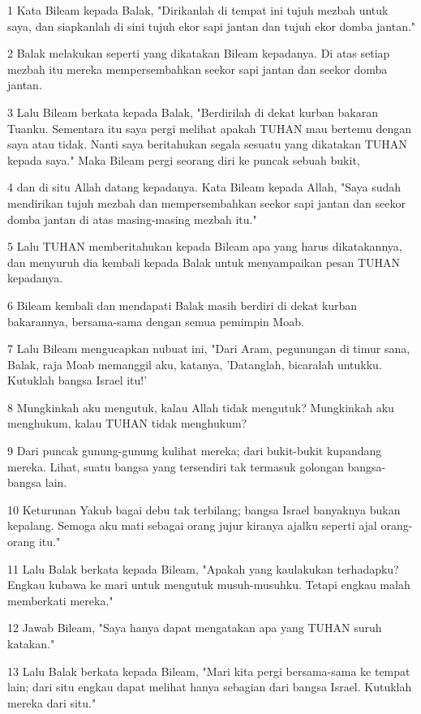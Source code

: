 \par 1 Kata Bileam kepada Balak, "Dirikanlah di tempat ini tujuh mezbah untuk saya, dan siapkanlah di sini tujuh ekor sapi jantan dan tujuh ekor domba jantan."
\par 2 Balak melakukan seperti yang dikatakan Bileam kepadanya. Di atas setiap mezbah itu mereka mempersembahkan seekor sapi jantan dan seekor domba jantan.
\par 3 Lalu Bileam berkata kepada Balak, "Berdirilah di dekat kurban bakaran Tuanku. Sementara itu saya pergi melihat apakah TUHAN mau bertemu dengan saya atau tidak. Nanti saya beritahukan segala sesuatu yang dikatakan TUHAN kepada saya." Maka Bileam pergi seorang diri ke puncak sebuah bukit,
\par 4 dan di situ Allah datang kepadanya. Kata Bileam kepada Allah, "Saya sudah mendirikan tujuh mezbah dan mempersembahkan seekor sapi jantan dan seekor domba jantan di atas masing-masing mezbah itu."
\par 5 Lalu TUHAN memberitahukan kepada Bileam apa yang harus dikatakannya, dan menyuruh dia kembali kepada Balak untuk menyampaikan pesan TUHAN kepadanya.
\par 6 Bileam kembali dan mendapati Balak masih berdiri di dekat kurban bakarannya, bersama-sama dengan semua pemimpin Moab.
\par 7 Lalu Bileam mengucapkan nubuat ini, "Dari Aram, pegunungan di timur sana, Balak, raja Moab memanggil aku, katanya, 'Datanglah, bicaralah untukku. Kutuklah bangsa Israel itu!'
\par 8 Mungkinkah aku mengutuk, kalau Allah tidak mengutuk? Mungkinkah aku menghukum, kalau TUHAN tidak menghukum?
\par 9 Dari puncak gunung-gunung kulihat mereka; dari bukit-bukit kupandang mereka. Lihat, suatu bangsa yang tersendiri tak termasuk golongan bangsa-bangsa lain.
\par 10 Keturunan Yakub bagai debu tak terbilang; bangsa Israel banyaknya bukan kepalang. Semoga aku mati sebagai orang jujur kiranya ajalku seperti ajal orang-orang itu."
\par 11 Lalu Balak berkata kepada Bileam, "Apakah yang kaulakukan terhadapku? Engkau kubawa ke mari untuk mengutuk musuh-musuhku. Tetapi engkau malah memberkati mereka."
\par 12 Jawab Bileam, "Saya hanya dapat mengatakan apa yang TUHAN suruh katakan."
\par 13 Lalu Balak berkata kepada Bileam, "Mari kita pergi bersama-sama ke tempat lain; dari situ engkau dapat melihat hanya sebagian dari bangsa Israel. Kutuklah mereka dari situ."
